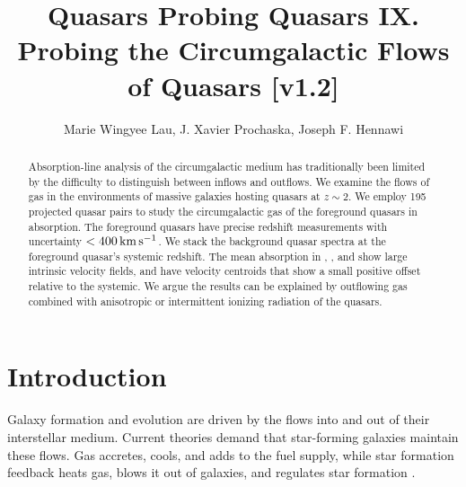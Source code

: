 \documentclass[iop]{emulateapj}
\begin{document}
\title{Quasars Probing Quasars IX. Probing the Circumgalactic Flows of Quasars [v1.2]}

\author{Marie Wingyee Lau, J. Xavier Prochaska, 
Joseph F. Hennawi
}

\begin{abstract}
Absorption-line analysis of the circumgalactic medium has traditionally been limited by the 
difficulty to distinguish between inflows and outflows. We examine the flows of gas in the 
environments of massive galaxies hosting quasars at $z\sim2$. We employ 195 projected quasar pairs 
to study the circumgalactic gas of the foreground quasars in absorption. The foreground quasars 
have precise redshift measurements with uncertainty $<400\,{\rm km\,s^{-1}}$. We stack the 
background quasar spectra at the foreground quasar's systemic redshift. The mean absorption in 
, , and  show large intrinsic velocity fields, and have velocity 
centroids that show a small positive offset relative to the systemic. We argue the results can be 
explained by outflowing gas combined with anisotropic or intermittent ionizing radiation of the 
quasars. 
\end{abstract}



\section{Introduction}
\label{sec:introduction}

Galaxy formation and evolution are driven by the flows into and out of their interstellar medium. 
Current theories demand that star-forming galaxies maintain these flows. Gas accretes, cools, and 
adds to the fuel supply, while star formation feedback heats gas, blows it out of galaxies, and 
regulates star formation \citep[for a review see][]{SomervilleDave15}. 
\end{document}
